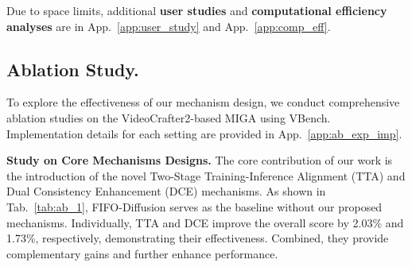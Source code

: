 \documentclass{article}
\theoremstyle{plain}
\theoremstyle{definition}
\theoremstyle{remark}
\begin{document}
Due to space limits, additional \textbf{user studies} and \textbf{computational efficiency analyses} are in App.~\ref{app:user_study} and App.~\ref{app:comp_eff}.





\subsection{Ablation Study.}
\label{sec:ablation}
To explore the effectiveness of our mechanism design, we conduct comprehensive ablation studies on the VideoCrafter2-based MIGA using VBench. Implementation details for each setting are provided in App.~\ref{app:ab_exp_imp}.




\textbf{Study on Core Mechanisms Designs.}
The core contribution of our work is the introduction of the novel Two-Stage Training-Inference Alignment (TTA) and Dual Consistency Enhancement (DCE) mechanisms. As shown in Tab.~\ref{tab:ab_1}, FIFO-Diffusion serves as the baseline without our proposed mechanisms. Individually, TTA and DCE improve the overall score by 2.03\% and 1.73\%, respectively, demonstrating their effectiveness. 
Combined, they provide complementary gains and further enhance performance.
\end{document}

